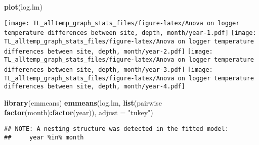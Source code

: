 \documentclass[
]{article}
\newenvironment{Shaded}{\begin{snugshade}}{\end{snugshade}}
\newcommand{\DataTypeTok}[1]{\textcolor[rgb]{0.13,0.29,0.53}{#1}}
\newcommand{\KeywordTok}[1]{\textcolor[rgb]{0.13,0.29,0.53}{\textbf{#1}}}
\newcommand{\NormalTok}[1]{#1}
\newcommand{\OperatorTok}[1]{\textcolor[rgb]{0.81,0.36,0.00}{\textbf{#1}}}
\newcommand{\StringTok}[1]{\textcolor[rgb]{0.31,0.60,0.02}{#1}}
\begin{document}
\begin{Shaded}
\begin{Highlighting}[]
\KeywordTok{plot}\NormalTok{(log.lm)}
\end{Highlighting}
\end{Shaded}

\texttt{[image: TL\_alltemp\_graph\_stats\_files/figure-latex/Anova on logger temperature differences between site, depth, month/year-1.pdf]}
\texttt{[image: TL\_alltemp\_graph\_stats\_files/figure-latex/Anova on logger temperature differences between site, depth, month/year-2.pdf]}
\texttt{[image: TL\_alltemp\_graph\_stats\_files/figure-latex/Anova on logger temperature differences between site, depth, month/year-3.pdf]}
\texttt{[image: TL\_alltemp\_graph\_stats\_files/figure-latex/Anova on logger temperature differences between site, depth, month/year-4.pdf]}

\begin{Shaded}
\begin{Highlighting}[]
\KeywordTok{library}\NormalTok{(emmeans)}
\KeywordTok{emmeans}\NormalTok{(log.lm, }\KeywordTok{list}\NormalTok{(pairwise }\OperatorTok{~}\StringTok{ }\KeywordTok{factor}\NormalTok{(month)}\OperatorTok{:}\KeywordTok{factor}\NormalTok{(year)), }\DataTypeTok{adjust =} \StringTok{"tukey"}\NormalTok{)}
\end{Highlighting}
\end{Shaded}

\begin{verbatim}
## NOTE: A nesting structure was detected in the fitted model:
##     year %in% month
\end{verbatim}
\end{document}
